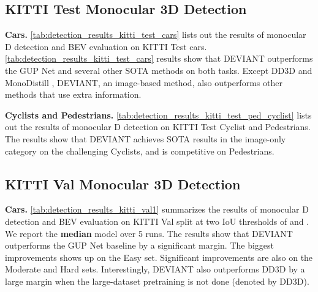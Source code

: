 \documentclass[runningheads]{llncs}
\newcommand{\threeD}{D}
\newcommand{\iou}{IoU}
\newcommand{\iouThreeD}{\iou}
\newcommand{\pretrain}{pretrain}
\newcommand{\kitti}{KITTI}
\newcommand{\valOne}{Val}
\newcommand{\imageOnly}{image-only}
\newcommand{\sota}{SOTA}
\newcommand{\gupNet}{GUP Net}
\newcommand{\ddThreeD}{DD3D}
\newcommand{\noIndentHeading}[1]{\noindent\textbf{#1}}
\newcommand{\methodName}{DEVIANT}
\begin{document}
\subsection{\kitti{} Test Monocular 3D Detection}\label{sec:detection_results_kitti_test}

\noIndentHeading{Cars.}
            \cref{tab:detection_results_kitti_test_cars} lists out the results of monocular \threeD{} detection and BEV evaluation on \kitti{} Test cars. 
            \cref{tab:detection_results_kitti_test_cars} results show that \methodName{} outperforms the \gupNet{} and several other \sota{} methods on both  tasks. 
            Except \ddThreeD \cite{park2021pseudo} and MonoDistill \cite{chong2022monodistill}, \methodName, an image-based method, also outperforms other methods that use extra information.

\noIndentHeading{Cyclists and Pedestrians.} 
            \cref{tab:detection_results_kitti_test_ped_cyclist} lists out the results of monocular \threeD{} detection on \kitti{} Test Cyclist and Pedestrians. 
            The results show that \methodName{} achieves \sota{} results in the \imageOnly{} category on the challenging Cyclists, and is competitive on Pedestrians.


\subsection{\kitti{} \valOne{} Monocular 3D Detection}\label{sec:detection_results_kitti_val1}
    
\noIndentHeading{Cars.}
            \cref{tab:detection_results_kitti_val1} summarizes the results of monocular \threeD{} detection and BEV evaluation on \kitti{} \valOne{} split at two \iouThreeD{} thresholds of  and  \cite{chen2020monopair,kumar2021groomed}. 
            We report the \textbf{median} model over 5 runs.
            The results show that \methodName{} outperforms the \gupNet{} \cite{lu2021geometry} baseline by a significant margin. 
            The biggest improvements shows up on the Easy set. 
            Significant improvements are also on the Moderate and Hard sets. Interestingly, \methodName{} also outperforms \ddThreeD \cite{park2021pseudo} by a large margin when the large-dataset \pretrain{}ing is not done (denoted by \ddThreeD).
\end{document}
